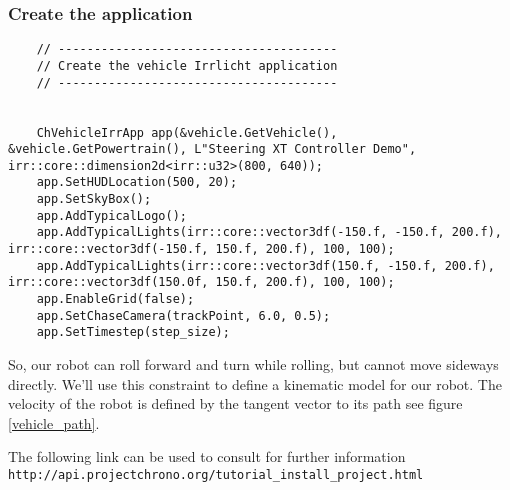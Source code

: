 \subsubsection{Create the application}

\begin{lstlisting}
    // ---------------------------------------
    // Create the vehicle Irrlicht application
    // ---------------------------------------


    ChVehicleIrrApp app(&vehicle.GetVehicle(), &vehicle.GetPowertrain(), L"Steering XT Controller Demo", irr::core::dimension2d<irr::u32>(800, 640));
    app.SetHUDLocation(500, 20);
    app.SetSkyBox();
    app.AddTypicalLogo();
    app.AddTypicalLights(irr::core::vector3df(-150.f, -150.f, 200.f), irr::core::vector3df(-150.f, 150.f, 200.f), 100, 100);
    app.AddTypicalLights(irr::core::vector3df(150.f, -150.f, 200.f), irr::core::vector3df(150.0f, 150.f, 200.f), 100, 100);
    app.EnableGrid(false);
    app.SetChaseCamera(trackPoint, 6.0, 0.5);
    app.SetTimestep(step_size);

\end{lstlisting}

So, our robot can roll forward and turn while rolling, but cannot move sideways directly. We'll use this constraint to define a kinematic model for our robot. The velocity of the robot is defined by the tangent vector to its path see figure \ref{vehicle_path}. 


The following link can be used to consult for further information \lstinline{http://api.projectchrono.org/tutorial_install_project.html}












